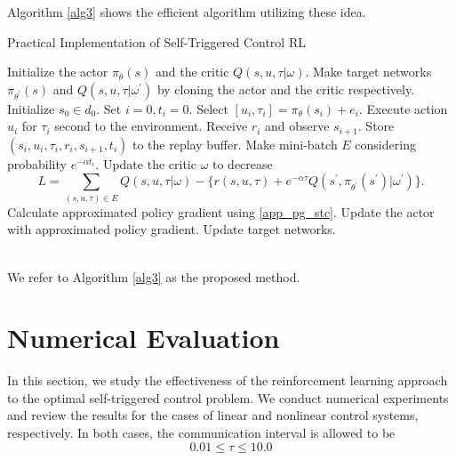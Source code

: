 \documentclass[english, dvipdfmx]{ampmt}             %
\begin{document}
Algorithm \ref{alg3} shows the efficient algorithm utilizing these idea.
\begin{algorithm}                      
\caption{Practical Implementation of Self-Triggered Control RL}         
\label{alg3}                          
\begin{algorithmic}                  
    \STATE Initialize the actor $\pi_{\theta}(s)$ and the critic $Q(s,u,\tau|\omega)$.
    \STATE Make target networks $\pi_{\theta^{\prime}}(s)$ and $Q(s,u,\tau|\omega^{\prime})$ by cloning the actor and the critic respectively.
    	\STATE Initialize $s_0\in d_0$.
    	\STATE Set $i = 0, t_i = 0$.
    		\STATE Select $[u_i, \tau_i] = \pi_{\theta}(s_i) + e_i$.
		\STATE Execute action $u_i$ for $\tau_i$ second to the environment.
		\STATE Receive $r_i$ and observe $s_{i+1}$.
		\STATE Store $(s_i, u_i, \tau_i, r_i, s_{i+1}, t_i)$ to the replay buffer.
		\STATE Make mini-batch $E$ considering probability $e^{-\alpha t_i}$.
		\STATE Update the critic $\omega$ to decrease 
			\[L = \sum_{(s,u,\tau)\in E}Q(s,u,\tau|\omega) - \{r(s,u,\tau) + e^{-\alpha\tau}Q(s^{\prime}, \pi_{\theta^{\prime}}(s^{\prime})|\omega^{\prime})\}.\] %
		\STATE Calculate approximated policy gradient using \eqref{app_pg_stc}.
		\STATE Update the actor with approximated policy gradient.
		\STATE Update target networks.
    	\ENDWHILE
    \ENDFOR
\end{algorithmic}
\end{algorithm}\\
We refer to Algorithm \ref{alg3} as the proposed method.

\section{Numerical Evaluation}
In this section, we study the effectiveness of the reinforcement learning approach to the optimal self-triggered control problem. We conduct numerical experiments and review the results for the cases of linear and nonlinear control systems, respectively. In both cases, the communication interval is allowed to be 
\begin{equation}
	0.01 \leq \tau \leq 10.0
\end{equation}
\end{document}
